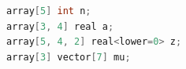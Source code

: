 \begin{lstlisting}[language=C++,label={code:PRE_02},caption={Stan2.32以降の書き方}]
array[5] int n;
array[3, 4] real a;
array[5, 4, 2] real<lower=0> z;
array[3] vector[7] mu;
\end{lstlisting}
